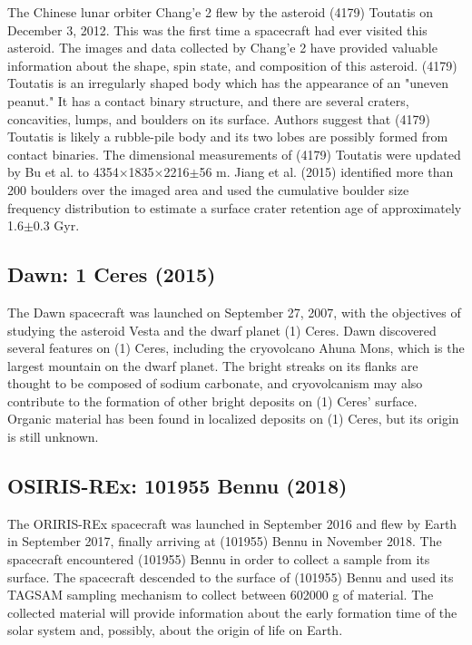 The Chinese lunar orbiter Chang'e 2 flew by the asteroid (4179) Toutatis on December 3, 2012. This was the first time a spacecraft had ever visited this asteroid. The images and data collected by Chang'e 2 have provided valuable information about the shape, spin state, and composition of this asteroid. (4179) Toutatis is an irregularly shaped body which has the appearance of an "uneven peanut." It has a contact binary structure, and there are several craters, concavities, lumps, and boulders on its surface. Authors suggest that (4179) Toutatis is likely a rubble-pile body and its two lobes are possibly formed from contact binaries. The dimensional measurements of (4179) Toutatis were updated by Bu et al. to 4354{$\times$}1835{$\times$}2216{$\pm$}56 m. Jiang et al. (2015) identiﬁed more than 200 boulders over the imaged area and used the cumulative boulder size frequency distribution to estimate a surface crater retention age of approximately 1.6{$\pm$}0.3 Gyr.

\subsection{Dawn: 1 Ceres (2015)}

The Dawn spacecraft was launched on September 27, 2007, with the objectives of studying the asteroid Vesta and the dwarf planet (1) Ceres. Dawn discovered several features on (1) Ceres, including the cryovolcano Ahuna Mons, which is the largest mountain on the dwarf planet. The bright streaks on its flanks are thought to be composed of sodium carbonate, and cryovolcanism may also contribute to the formation of other bright deposits on (1) Ceres' surface. Organic material has been found in localized deposits on (1) Ceres, but its origin is still unknown.

\subsection{OSIRIS-REx: 101955 Bennu (2018)}

The ORIRIS-REx spacecraft was launched in September 2016 and flew by Earth in September 2017, finally arriving at (101955) Bennu in November 2018. The spacecraft encountered (101955) Bennu in order to collect a sample from its surface. The spacecraft descended to the surface of (101955) Bennu and used its TAGSAM sampling mechanism to collect between 60{\textemdash}2000 g of material. The collected material will provide information about the early formation time of the solar system and, possibly, about the origin of life on Earth.

